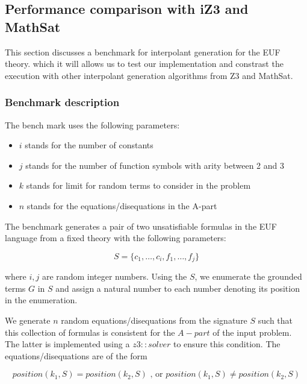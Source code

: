 \subsection{Performance comparison with iZ3 and MathSat}\label{performance_euf}

This section discusses a benchmark for interpolant generation
for the EUF theory.
which it will allows us to test 
our implementation and constrast the execution with 
other interpolant generation
algorithms from Z3 and MathSat.

\subsubsection{Benchmark description}

The bench mark uses the following parameters:

\begin{itemize}
  \item[] $i$ stands for the number of constants
  \item[] $j$ stands for the number of function symbols
    with arity between 2 and 3
  \item[] $k$ stands for limit for random terms to consider
    in the problem
  \item[] $n$ stands for the equations/disequations in the
    A-part
\end{itemize}

The benchmark generates a pair of two unsatisfiable formulas
in the EUF language from a fixed theory with the following parameters:

\begin{equation*}
  S = \{ c_1, \dots, c_i, f_1, \dots, f_j \}
\end{equation*}

where $i, j$ are random integer numbers. Using the $S$, we
enumerate the grounded terms $G$ in $S$ and assign a natural 
number to each number denoting its position in the enumeration.

We generate $n$ random equations/disequations from the signature $S$ 
such that this
collection of formulas is consistent for the $A-part$ of
the input problem. 
The latter is implemented using a $z3: :solver$ to ensure 
this condition.
The equations/disequations are of the form

\begin{equation*}
  position(k_1, S) = position(k_2, S) \text{ , or } position(k_1, S) \neq position(k_2, S) 
\end{equation*}

